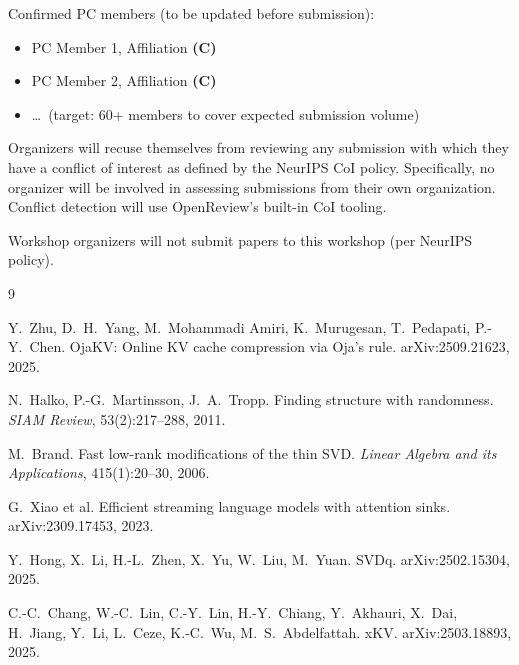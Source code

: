 \documentclass{article}
\begin{document}
Confirmed PC members (to be updated before submission):
\begin{itemize}[nosep,leftmargin=1.5em]
  \item PC Member 1, Affiliation \textbf{(C)}
  \item PC Member 2, Affiliation \textbf{(C)}
  \item \ldots\ (target: 60+ members to cover expected submission volume)
\end{itemize}

Organizers will recuse themselves from reviewing any submission with which they
have a conflict of interest as defined by the NeurIPS CoI policy.
Specifically, no organizer will be involved in assessing submissions from their
own organization.  Conflict detection will use OpenReview's built-in CoI tooling.

Workshop organizers will not submit papers to this workshop (per NeurIPS policy).


\begin{thebibliography}{9}

Y.~Zhu, D.~H.~Yang, M.~Mohammadi Amiri, K.~Murugesan, T.~Pedapati, P.-Y.~Chen.
OjaKV: Online KV cache compression via Oja's rule.
arXiv:2509.21623, 2025.

N.~Halko, P.-G.~Martinsson, J.~A.~Tropp.
Finding structure with randomness.
\emph{SIAM Review}, 53(2):217--288, 2011.

M.~Brand.
Fast low-rank modifications of the thin SVD.
\emph{Linear Algebra and its Applications}, 415(1):20--30, 2006.

G.~Xiao et al.
Efficient streaming language models with attention sinks.
arXiv:2309.17453, 2023.

Y.~Hong, X.~Li, H.-L.~Zhen, X.~Yu, W.~Liu, M.~Yuan. SVDq. arXiv:2502.15304, 2025.

C.-C.~Chang, W.-C.~Lin, C.-Y.~Lin, H.-Y.~Chiang, Y.~Akhauri, X.~Dai, H.~Jiang, Y.~Li, L.~Ceze, K.-C.~Wu, M.~S.~Abdelfattah. xKV. arXiv:2503.18893, 2025.

\end{thebibliography}
\end{document}
